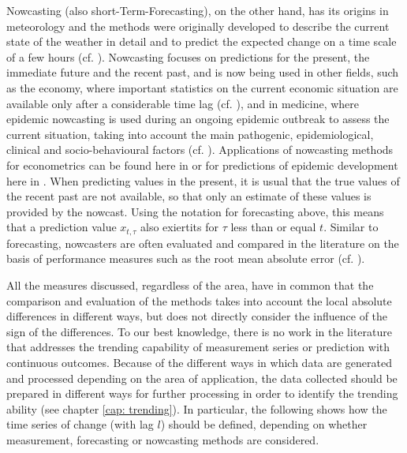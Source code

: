 Nowcasting (also short-Term-Forecasting), on the other hand, has its origins in meteorology and the methods were originally developed to describe the current state of the weather in detail and to predict the expected change on a time scale of a few hours (cf. \cite{browning1989nowcasting,schmid2019nowcasting}). Nowcasting focuses on predictions for the present, the immediate future and the recent past, and is now being used in other fields, such as the economy, where important statistics on the current economic situation are available only after a considerable time lag (cf. \cite{banbura2013now}), and in medicine, where epidemic nowcasting is used during an ongoing epidemic outbreak to assess the current situation, taking into account the main pathogenic, epidemiological, clinical and socio-behavioural factors (cf. \cite{wu2021nowcasting}). Applications of nowcasting methods for econometrics can be found here in \cite{giannone2006nowcasting,fornaro2020nowcasting,bok2018macroeconomic} or for predictions of epidemic development here in \cite{johansson2014nowcasting,gunther2021nowcasting,birrell2021real}. When predicting values in the present, it is usual that the true values of the recent past are not available, so that only an estimate of these values is provided by the nowcast. Using the notation for forecasting above, this means that a prediction value $x_{t,\tau}$ also exiertits for $\tau$ less than or equal $t$. Similar to forecasting, nowcasters are often evaluated and  compared in the literature on the basis of performance measures such as the root mean absolute error (cf. \cite{gunther2021nowcasting}).

All the measures discussed, regardless of the area, have in common that the comparison and evaluation of the methods takes into account the local absolute differences in different ways, but does not directly consider the influence of the sign of the differences. To our best knowledge, there is no work in the literature that addresses the trending capability of measurement series or prediction with continuous outcomes. Because of the different ways in which data are generated and processed depending on the area of application, the data collected should be prepared in different ways for further processing in order to identify the trending ability (see chapter \ref{cap: trending}). In particular, the following shows how the time series of change (with lag $l$) should be defined, depending on whether measurement, forecasting or nowcasting methods are considered.

